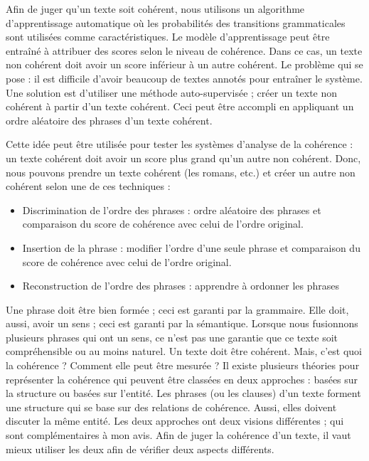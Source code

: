 \documentclass{KodeBook}
\begin{document}
Afin de juger qu'un texte soit cohérent, nous utilisons un algorithme d'apprentissage automatique où les probabilités des transitions grammaticales sont utilisées comme caractéristiques. 
Le modèle d'apprentissage peut être entraîné à attribuer des scores selon le niveau de cohérence.
Dans ce cas, un texte non cohérent doit avoir un score inférieur à un autre cohérent.
Le problème qui se pose : il est difficile d'avoir beaucoup de textes annotés pour entraîner le système.
Une solution est d'utiliser une méthode auto-supervisée ; créer un texte non cohérent à partir d'un texte cohérent. 
Ceci peut être accompli en appliquant un ordre aléatoire des phrases d'un texte cohérent. 

Cette idée peut être utilisée pour tester les systèmes d'analyse de la cohérence : un texte cohérent doit avoir un score plus grand qu'un autre non cohérent. 
Donc, nous pouvons prendre un texte cohérent (les romans, etc.) et créer un autre non cohérent selon une de ces techniques :
\begin{itemize}
	\item Discrimination de l'ordre des phrases : ordre aléatoire des phrases et comparaison du score de cohérence avec celui de l'ordre original.
	\item Insertion de la phrase : modifier l'ordre d'une seule phrase et comparaison du score de cohérence avec celui de l'ordre original.
	\item Reconstruction de l'ordre des phrases : apprendre à ordonner les phrases
\end{itemize}

Une phrase doit être bien formée ; ceci est garanti par la grammaire. 
Elle doit, aussi, avoir un sens ; ceci est garanti par la sémantique. 
Lorsque nous fusionnons plusieurs phrases qui ont un sens, ce n'est pas une garantie que ce texte soit compréhensible ou au moins naturel. 
Un texte doit être cohérent. 
Mais, c'est quoi la cohérence ? Comment elle peut être mesurée ?
Il existe plusieurs théories pour représenter la cohérence qui peuvent être classées en deux approches : basées sur la structure ou basées sur l'entité. 
Les phrases (ou les clauses) d'un texte forment une structure qui se base sur des relations de cohérence. 
Aussi, elles doivent discuter la même entité.
Les deux approches ont deux visions différentes ; qui sont complémentaires à mon avis. 
Afin de juger la cohérence d'un texte, il vaut mieux utiliser les deux afin de vérifier deux aspects différents.
\end{document}
